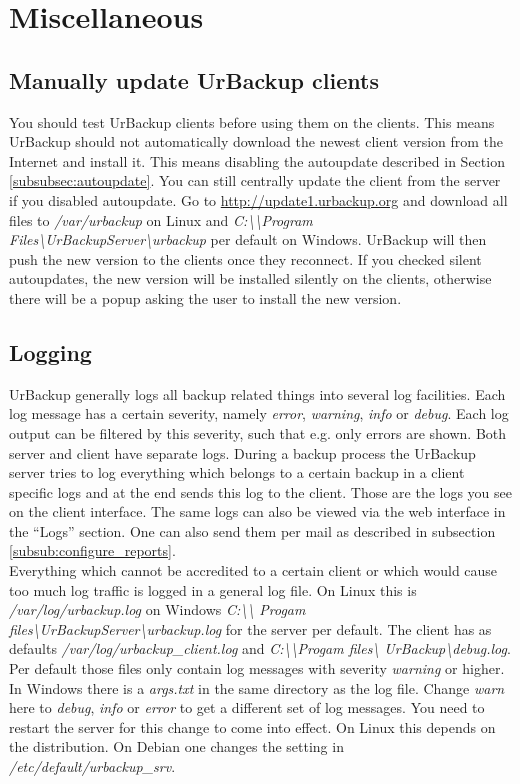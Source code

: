 \documentclass[a4paper,10pt]{article}
\begin{document}
\section{Miscellaneous}

\subsection{Manually update UrBackup clients}

You should test UrBackup clients before using them on the clients. This means
UrBackup should not automatically download the newest client version from
the Internet and install it. This means disabling the autoupdate described in
Section \ref{subsubsec:autoupdate}. You can still centrally update the client
from the server if you disabled autoupdate. Go to \url{http://update1.urbackup.org}
and download all files to \textsl{/var/urbackup} on Linux and
\textsl{C:\textbackslash\textbackslash Program Files\textbackslash UrBackupServer\textbackslash urbackup} per default on Windows. UrBackup
will then push the new version to the clients once they reconnect. If you checked
silent autoupdates, the new version will be installed silently on the clients, otherwise
there will be a popup asking the user to install the new version.

\subsection{Logging}
\label{sec:logging}

UrBackup generally logs all backup related things into several log facilities.
Each log message has a certain severity, namely \textsl{error},
\textsl{warning}, \textsl{info} or \textsl{debug}.
Each log output can be filtered by this severity, such that e.g. only errors are
shown. Both server and client have separate logs. During a backup process the
UrBackup server tries to log everything which belongs to a certain backup in a
client specific logs and at the end sends this log to the client. Those are the
logs you see on the client interface. The same logs can also be viewed via the
web interface in the ``Logs'' section. One can also send them per mail as
described in subsection \ref{subsub:configure_reports}.\\
Everything which cannot be accredited to a certain client or which would cause
too much log traffic is logged in a general log file. On Linux this is
\textsl{/var/log/urbackup.log} on Windows \textsl{C:\textbackslash\textbackslash
Progam files\textbackslash UrBackupServer\textbackslash urbackup.log} for the
server per default.  The client has as defaults
\textsl{/var/log/urbackup\_client.log} and
\textsl{C:\textbackslash\textbackslash Progam files\textbackslash
UrBackup\textbackslash debug.log}. Per default those files only contain log
messages with severity \textsl{warning} or higher. In Windows there is a
\textsl{args.txt} in the same directory as the log file. Change \textsl{warn}
here to \textsl{debug}, \textsl{info} or \textsl{error} to get a different set
of log messages. You need to restart the server for this change to come into
effect. On Linux this depends on the distribution. On Debian one changes the
setting in \textsl{/etc/default/urbackup\_srv}.
\end{document}

